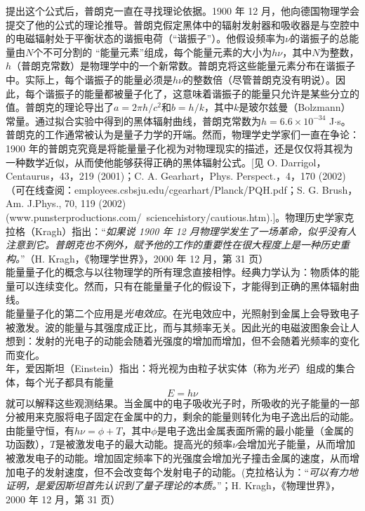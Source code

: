\documentclass{book}
\begin{document}
	\indent 提出这个公式后，普朗克一直在寻找理论依据。1900 年 12 月，他向德国物理学会提交了他的公式的理论推导。普朗克假定黑体中的辐射发射器和吸收器是与空腔中的电磁辐射处于平衡状态的谐振电荷（“谐振子”）。他假设频率为$\nu$的谐振子的总能量由$N$个不可分割的 “能量元素”组成，每个能量元素的大小为$h\nu$，其中$N$为整数，$h$（普朗克常数）是物理学中的一个新常数。普朗克将这些能量元素分布在谐振子中。实际上，每个谐振子的能量必须是$h\nu$的整数倍（尽管普朗克没有明说）。因此，每个谐振子的能量都被量子化了，这意味着谐振子的能量只允许是某些分立的值。普朗克的理论导出了$a=2 \pi  h/c^2$和$b=h/k$，其中$k$是玻尔兹曼（Bolzmann）常量。通过拟合实验中得到的黑体辐射曲线，普朗克常数为$h=6.6 \times 10^{-34}$ J$\cdot$s。\\
	\indent 普朗克的工作通常被认为是量子力学的开端。然而，物理学史学家们一直在争论：1900 年的普朗克究竟是将能量量子化视为对物理现实的描述，还是仅仅将其视为一种数学近似，从而使他能够获得正确的黑体辐射公式。[见 O. Darrigol，Centaurus，43，219 (2001)；C. A. Gearhart，Phys. Perspect.，4，170 (2002)（可在线查阅：employees.csbsju.edu/cgearhart/Planck/PQH.pdf；S. G. Brush，Am. J.Phys., 70, 119 (2002) (www.punsterproductions.com/~sciencehistory/cautious.htm).]。物理历史学家克拉格（Kragh）指出：“\textit{如果说 1900 年 12 月物理学发生了一场革命，似乎没有人注意到它。普朗克也不例外，赋予他的工作的重要性在很大程度上是一种历史重构。}”（H. Kragh，《物理学世界》，2000 年 12 月，第 31 页）\\
	\indent 能量量子化的概念与以往物理学的所有理念直接相悖。经典力学认为：物质体的能量可以连续变化。然而，只有在能量量子化的假设下，才能得到正确的黑体辐射曲线。\\
	\indent 能量量子化的第二个应用是\textit{光电效应}。在光电效应中，光照射到金属上会导致电子被激发。波的能量与其强度成正比，而与其频率无关。因此光的电磁波图象会让人想到：发射的光电子的动能会随着光强度的增加而增加，但不会随着光频率的变化而变化。\\
	 年，爱因斯坦（Einstein）指出：将光视为由粒子状实体（称为\textit{光子}）组成的集合体，每个光子都具有能量
	\begin{equation}
		\boxed{E=h\nu}
		\label{eq:photoelectric effect equation}
	\end{equation}
	就可以解释这些观测结果。当金属中的电子吸收光子时，所吸收的光子能量的一部分被用来克服将电子固定在金属中的力，剩余的能量则转化为电子逸出后的动能。由能量守恒，有$h\nu = \phi+ T$，其中$\phi$是电子逸出金属表面所需的最小能量（金属的功函数），$T$是被激发电子的最大动能。提高光的频率$\nu$会增加光子能量，从而增加被激发电子的动能。增加固定频率下的光强度会增加光子撞击金属的速度，从而增加电子的发射速度，但不会改变每个发射电子的动能。(克拉格认为：“\textit{可以有力地证明，是爱因斯坦首先认识到了量子理论的本质。}”；H. Kragh，《物理世界》，2000 年 12 月，第 31 页）\\
\end{document}
